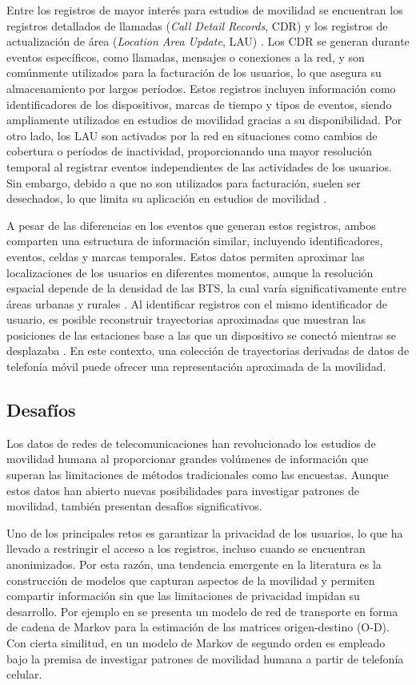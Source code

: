 Entre los registros de mayor interés para estudios de movilidad se encuentran los registros detallados de llamadas (\textit{Call Detail Records}, CDR) y los registros de actualización de área (\textit{Location Area Update}, LAU) \cite{gutierrez2020como}. Los CDR se generan durante eventos específicos, como llamadas, mensajes o conexiones a la red, y son comúnmente utilizados para la facturación de los usuarios, lo que asegura su almacenamiento por largos períodos. Estos registros incluyen información como identificadores de los dispositivos, marcas de tiempo y tipos de eventos, siendo ampliamente utilizados en estudios de movilidad gracias a su disponibilidad. Por otro lado, los LAU son activados por la red en situaciones como cambios de cobertura o períodos de inactividad, proporcionando una mayor resolución temporal al registrar eventos independientes de las actividades de los usuarios. Sin embargo, debido a que no son utilizados para facturación, suelen ser desechados, lo que limita su aplicación en estudios de movilidad \cite{durive2021sistema}.

A pesar de las diferencias en los eventos que generan estos registros, ambos comparten una estructura de información similar, incluyendo identificadores, eventos, celdas y marcas temporales. Estos datos permiten aproximar las localizaciones de los usuarios en diferentes momentos, aunque la resolución espacial depende de la densidad de las BTS, la cual varía significativamente entre áreas urbanas y rurales \cite{forghani2020cellular}. Al identificar registros con el mismo identificador de usuario, es posible reconstruir trayectorias aproximadas que muestran las posiciones de las estaciones base a las que un dispositivo se conectó mientras se desplazaba \cite{chen2018individual}. En este contexto, una colección de trayectorias derivadas de datos de telefonía móvil puede ofrecer una representación aproximada de la movilidad.

\subsection{Desafíos}

Los datos de redes de telecomunicaciones han revolucionado los estudios de movilidad humana al proporcionar grandes volúmenes de información que superan las limitaciones de métodos tradicionales como las encuestas. Aunque estos datos han abierto nuevas posibilidades para investigar patrones de movilidad, también presentan desafíos significativos.

Uno de los principales retos es garantizar la privacidad de los usuarios, lo que ha llevado a restringir el acceso a los registros, incluso cuando se encuentran anonimizados. Por esta razón, una tendencia emergente en la literatura es la construcción de modelos que capturan aspectos de la movilidad y permiten compartir información sin que las limitaciones de privacidad impidan su desarrollo. Por ejemplo en \cite{tesselkin2017estimation} se presenta un modelo de red de transporte en forma de cadena de Markov para la estimación de las matrices origen-destino (O-D). Con cierta similitud, en \cite{pourmoradnasseri2019od} un modelo de Markov de segundo orden es empleado bajo la premisa de investigar patrones de movilidad humana a partir de telefonía celular.

